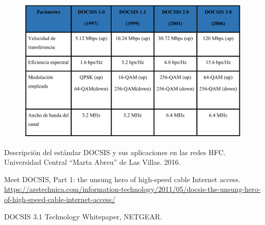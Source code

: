 \begin{figure}[ht!]
\centering
\includegraphics[scale=0.66]{Imagenes/tabla_comparacion.png}
\end{figure}

\begin{thebibliography}{9}
Descripción del estándar DOCSIS y sus aplicaciones en las redes HFC. Universidad Central “Marta Abreu” de Las Villas. 2016.

Meet DOCSIS, Part 1: the unsung hero of high-speed cable Internet access. \href{https://arstechnica.com/information-technology/2011/05/docsis-the-unsung-hero-of-high-speed-cable-internet-access/}{https://arstechnica.com/information-technology/2011/05/docsis-the-unsung-hero-of-high-speed-cable-internet-access/}

DOCSIS 3.1 Technology Whitepaper, NETGEAR.

\end{thebibliography}

